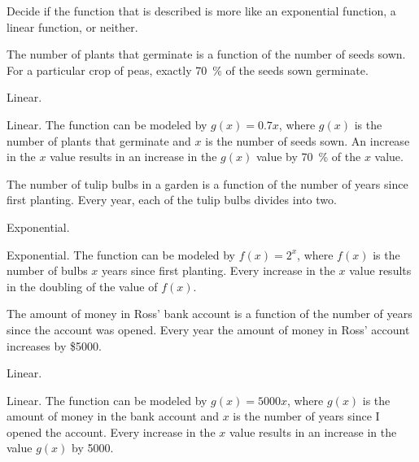 \begin{exercises}
\begin{problem}
Decide if the function that is described is more like an exponential function, a linear function, or neither.
\begin{subproblem}
	The number of plants that germinate is a function of the number of seeds sown.
	For a particular crop of peas, exactly \SI{70}{\percent} of the seeds sown germinate. 
	\begin{shortsolution}
		Linear. 
	\end{shortsolution}
	\begin{longsolution}
		Linear. The function can be modeled by $g(x)=0.7x$, where $g(x)$ is the number 
		of plants that germinate and $x$ is the number of seeds sown. An increase in the $x$ 
		value results in an increase in the $g(x)$ value by \SI{70}{\percent} of the $x$ value. 
	\end{longsolution}
\end{subproblem}
\begin{subproblem}
	The number of tulip bulbs in a garden is a function of the number of years since first planting.
	Every year, each of the tulip bulbs divides into two. 
	\begin{shortsolution}
		Exponential. 
	\end{shortsolution}
	\begin{longsolution}
		Exponential. The function can be modeled by $f(x)=2^x$, where $f(x)$ is the 
		number of bulbs $x$ years since first planting. Every increase in the $x$ value 
		results in the doubling of the value of $f(x)$.
	\end{longsolution}
\end{subproblem}
\begin{subproblem}
	The amount of money in Ross' bank account is a function of the number of years since the account was opened. 	
	Every year the amount of money in Ross' account increases by \$5000. 
	\begin{shortsolution}
		Linear. 
	\end{shortsolution}
	\begin{longsolution}
		Linear. The function can be modeled by $g(x)=5000x$, where $g(x)$ is the amount of money 
		in the bank account and $x$ is the number of years since I opened the account. Every 
		increase in the $x$ value results in an increase in the value $g(x)$ by 5000.
	\end{longsolution}

\end{subproblem}
\end{problem}
\end{exercises}
